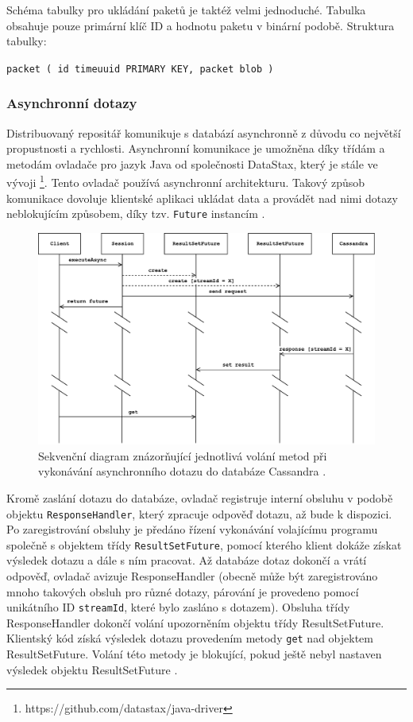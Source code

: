Schéma tabulky pro ukládání paketů je taktéž velmi jednoduché. Tabulka obsahuje pouze primární klíč ID a hodnotu paketu v binární podobě. Struktura tabulky:

\vspace{0.5cm}
\texttt{packet (
	id timeuuid PRIMARY KEY,
	packet blob
)}

\subsubsection{Asynchronní dotazy}
Distribuovaný repositář komunikuje s databází asynchronně z důvodu co největší propustnosti a rychlosti. Asynchronní komunikace je umožněna díky třídám a metodám ovladače pro jazyk Java od společnosti DataStax, který je stále ve vývoji \footnote{https://github.com/datastax/java-driver}. Tento ovladač používá asynchronní architekturu. Takový způsob komunikace dovoluje klientské aplikaci ukládat data a provádět nad nimi dotazy neblokujícím způsobem, díky tzv. \texttt{Future} instancím \cite{asyncQueriesCassandra}.

\begin{figure}[!h]
  \centering
  \includegraphics[width=15cm]{template-fig/CassandraAsyncQueries.pdf}
  \caption{Sekvenční diagram znázorňující jednotlivá volání metod při vykonávání asynchronního dotazu do databáze Cassandra \cite{asyncQueriesCassandra}.}
  \label{FIG_CassandraAsyncQueries}
\end{figure}

\noindent Kromě zaslání dotazu do databáze, ovladač registruje interní obsluhu v podobě objektu \texttt{ResponseHandler}, který zpracuje odpověď dotazu, až bude k dispozici. Po zaregistrování obsluhy je předáno řízení vykonávání volajícímu programu společně s objektem třídy \texttt{ResultSetFuture}, pomocí kterého klient dokáže získat výsledek dotazu a dále s ním pracovat.
Až databáze dotaz dokončí a vrátí odpověď, ovladač avizuje ResponseHandler (obecně může být zaregistrováno mnoho takových obsluh pro různé dotazy, párování je provedeno pomocí unikátního ID \texttt{streamId}, které bylo zasláno s dotazem). Obsluha třídy ResponseHandler dokončí volání upozorněním objektu třídy ResultSetFuture.
Klientský kód získá výsledek dotazu provedením metody \texttt{get} nad objektem ResultSetFuture. Volání této metody je blokující, pokud ještě nebyl nastaven výsledek objektu ResultSetFuture \cite{asyncQueriesCassandra}.

